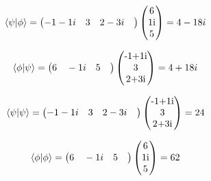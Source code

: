 \documentclass[10pt,a4paper]{article}
\begin{document}
\begin{align}
\braket{\psi|\phi}= \begin{pmatrix}
-1-1i\quad3\quad2-3i\quad\end{pmatrix}\begin{pmatrix}
$6$\\
$1i$\\
$5$\\
\end{pmatrix}=4-18i &\end{align}

\begin{align}
\braket{\phi|\psi}= \begin{pmatrix}
6\quad-1i\quad5\quad\end{pmatrix}\begin{pmatrix}
$-1+1i$\\
$3$\\
$2+3i$\\
\end{pmatrix}=4+18i &\end{align}

\begin{align}
\braket{\psi|\psi}= \begin{pmatrix}
-1-1i\quad3\quad2-3i\quad\end{pmatrix}\begin{pmatrix}
$-1+1i$\\
$3$\\
$2+3i$\\
\end{pmatrix}=24&\end{align}

\begin{align}
\braket{\phi|\phi}= \begin{pmatrix}
6\quad-1i\quad5\quad\end{pmatrix}\begin{pmatrix}
$6$\\
$1i$\\
$5$\\
\end{pmatrix}=62&\end{align}
\end{document}
